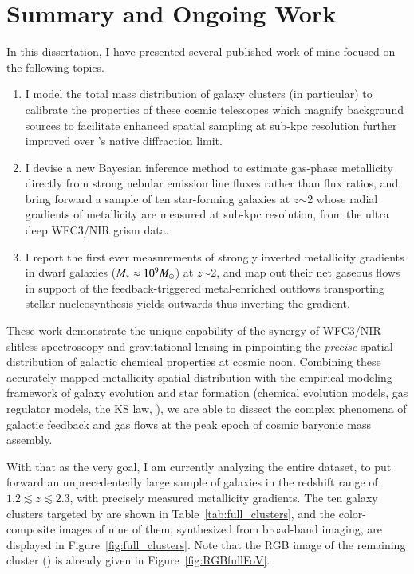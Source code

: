 
\chapter{Summary and Ongoing Work}

In this dissertation, I have presented several published work of mine focused on the following topics.

\begin{enumerate}
    \item I model the total mass distribution of galaxy clusters (\cler in particular) to calibrate the
    properties of these cosmic telescopes which magnify background sources to facilitate enhanced spatial
    sampling at sub-kpc resolution further improved over \hst's native diffraction limit.
    \item I devise a new Bayesian inference method to estimate gas-phase metallicity directly from strong nebular emission
    line
    fluxes rather than flux ratios, and bring forward a sample of ten star-forming galaxies at $z$$\sim$2 whose
    radial gradients of metallicity are measured at sub-kpc resolution, from the ultra deep \hst WFC3/NIR grism
    data.
    \item I report the first ever measurements of strongly inverted metallicity gradients in dwarf galaxies
    ($M_\ast\approx10^9M_\odot$) at $z$$\sim$2, and map out their net gaseous flows in support of the
    feedback-triggered metal-enriched outflows transporting stellar nucleosynthesis yields outwards thus
    inverting the gradient.
\end{enumerate}

These work demonstrate the unique capability of the synergy of \hst WFC3/NIR slitless spectroscopy and
gravitational lensing in pinpointing the \emph{precise} spatial distribution of galactic chemical properties at
cosmic noon.  Combining these accurately mapped metallicity spatial distribution with the empirical modeling
framework of galaxy evolution and star formation (\eg chemical evolution models, gas regulator models, the KS
law, \etc), we are able to dissect the complex phenomena of galactic feedback and gas flows at the peak epoch of
cosmic baryonic mass assembly.

With that as the very goal, I am currently analyzing the entire \glass dataset, to put forward an unprecedentedly
large sample of galaxies in the redshift range of $1.2\lesssim z\lesssim2.3$, with precisely measured metallicity
gradients. The ten galaxy clusters targeted by \glass are shown in Table~\ref{tab:full_clusters}, and the
color-composite images of nine of them, synthesized from \hst broad-band imaging, are displayed in
Figure~\ref{fig:full_clusters}. Note that the RGB image of the remaining cluster (\ie \clyi) is already given in
Figure~\ref{fig:RGBfullFoV}.

